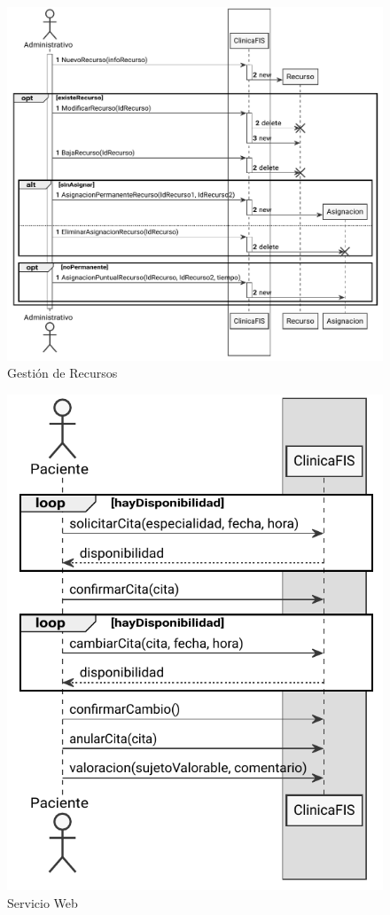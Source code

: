\documentclass[11pt,a4paper]{article}
\begin{document}
\begin{figure}[H]
	\caption{Gestión de Recursos}
	\centering
	\includegraphics[width=\textwidth,height=\textheight,keepaspectratio]{diagramas/pdf/diagramaRecursos.pdf}
\end{figure}

\begin{figure}[H]
	\caption{Servicio Web}
	\centering
	\includegraphics[width=\textwidth,height=\textheight,keepaspectratio]{diagramas/pdf/diagramaServicioWeb.pdf}
\end{figure}
\end{document}
